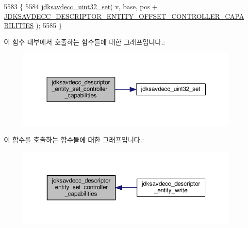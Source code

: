 \begin{DoxyCode}
5583 \{
5584     \hyperlink{group__endian_ga59b24ae6f7f47ca4d24ea337543162bf}{jdksavdecc\_uint32\_set}( v, base, pos + 
      \hyperlink{group__descriptor__entity_ga3bcdf49f39a5a219f1f0ae016cf56a27}{JDKSAVDECC\_DESCRIPTOR\_ENTITY\_OFFSET\_CONTROLLER\_CAPABILITIES}
       );
5585 \}
\end{DoxyCode}


이 함수 내부에서 호출하는 함수들에 대한 그래프입니다.\+:
\nopagebreak
\begin{figure}[H]
\begin{center}
\leavevmode
\includegraphics[width=346pt]{group__descriptor__entity_ga1a2d2134abe752eeedadf7ca4294ade9_cgraph}
\end{center}
\end{figure}




이 함수를 호출하는 함수들에 대한 그래프입니다.\+:
\nopagebreak
\begin{figure}[H]
\begin{center}
\leavevmode
\includegraphics[width=344pt]{group__descriptor__entity_ga1a2d2134abe752eeedadf7ca4294ade9_icgraph}
\end{center}
\end{figure}


